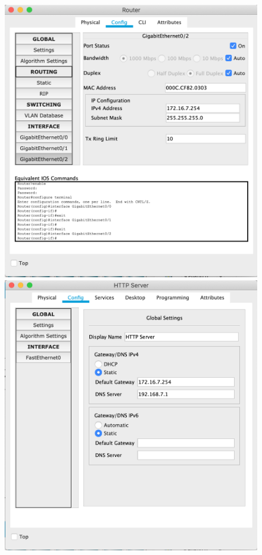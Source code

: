 \documentclass[a4paper,12pt]{article}
\begin{document}
	\begin{figure}[h!]
		\begin{minipage}[b]{0.32\textwidth}
			\includegraphics[width=\textwidth]{7.1.png}
		\end{minipage}
		\begin{minipage}[b]{0.32\textwidth}
			\includegraphics[width=\textwidth]{7.2.png}

\end{minipage}
\end{figure}
\end{document}
